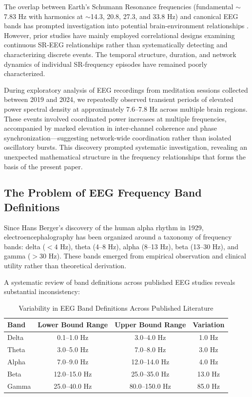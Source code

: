 \documentclass[11pt,a4paper]{article}
\begin{document}
The overlap between Earth's Schumann Resonance frequencies (fundamental $\sim$7.83 Hz with harmonics at $\sim$14.3, 20.8, 27.3, and 33.8 Hz) and canonical EEG bands has prompted investigation into potential brain-environment relationships \parencite{konig1974eeg, cherry2002schumann, persinger2008possible, saroka2016similar}. However, prior studies have mainly employed correlational designs examining continuous SR-EEG relationships rather than systematically detecting and characterizing discrete events. The temporal structure, duration, and network dynamics of individual SR-frequency episodes have remained poorly characterized.

During exploratory analysis of EEG recordings from meditation sessions collected between 2019 and 2024, we repeatedly observed transient periods of elevated power spectral density at approximately 7.6--7.8 Hz across multiple brain regions. These events involved coordinated power increases at multiple frequencies, accompanied by marked elevation in inter-channel coherence and phase synchronization---suggesting network-wide coordination rather than isolated oscillatory bursts. This discovery prompted systematic investigation, revealing an unexpected mathematical structure in the frequency relationships that forms the basis of the present paper.

\subsection{The Problem of EEG Frequency Band Definitions}

Since Hans Berger's discovery of the human alpha rhythm in 1929, electroencephalography has been organized around a taxonomy of frequency bands: delta ($<4$ Hz), theta (4--8 Hz), alpha (8--13 Hz), beta (13--30 Hz), and gamma ($>30$ Hz). These bands emerged from empirical observation and clinical utility rather than theoretical derivation.

A systematic review of band definitions across published EEG studies reveals substantial inconsistency:

\begin{table}[H]
\centering
\caption{Variability in EEG Band Definitions Across Published Literature}
\label{tab:band_variability}
\begin{tabular}{@{}lccc@{}}
\toprule
Band & Lower Bound Range & Upper Bound Range & Variation \\
\midrule
Delta & 0.1--1.0 Hz & 3.0--4.0 Hz & 1.0 Hz \\
Theta & 3.0--5.0 Hz & 7.0--8.0 Hz & 3.0 Hz \\
Alpha & 7.0--9.0 Hz & 12.0--14.0 Hz & 4.0 Hz \\
Beta & 12.0--15.0 Hz & 25.0--35.0 Hz & 13.0 Hz \\
Gamma & 25.0--40.0 Hz & 80.0--150.0 Hz & 85.0 Hz \\
\bottomrule
\end{tabular}
\end{table}
\end{document}
